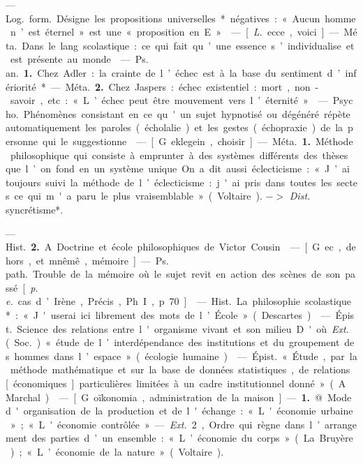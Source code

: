 
	\begin{itemize}[leftmargin=1cm, label=, itemsep=1pt]

 — \si{Log.} \si{form.} Désigne les propositions universelles* négatives : « Aucun homme n’est éternel » est une
« proposition en E ».

 — [{\it L.} ecce, voici] — \si{Méta.} Dans
le lang. scolastique : ce qui fait qu’une
essence s’individualise et est présente au monde.

 — \si{Ps. an.} {\bf 1.} Chez Adler : la
crainte de l’échec est à la base du
sentiment d’infériorité*. — \si{Méta.}
 {\bf 2.} Chez Jaspers : échec existentiel :
mort, non-savoir, etc. : « L’échec
peut être mouvement vers l’éternité. »

 — \si{Psycho.}
Phénomènes consistant en ce qu'un
sujet hypnotisé ou dégénéré répète
automatiquement les paroles (écholalie) et les gestes (échopraxie) de la
personne qui le suggestionne.

 — [G. eklegein, choisir] —
\si{Méta.} {\bf 1.} Méthode philosophique qui
consiste à emprunter à des systèmes
différents des thèses que l’on fond
en un système unique. On a dit aussi
éclecticisme : « J’ai toujours suivi la
méthode de l’éclecticisme : j'ai pris
dans toutes les sectes ce qui m'a
paru le plus vraisemblable » (Voltaire). $->$ {\it Dist.} syncrétisme*.

— \si{Hist.} {\bf 2.} A. Doctrine et école
philosophiques de Victor Cousin.

 — [G. ec, dehors, et mnêmê,
mémoire] — \si{Ps. path.} Trouble de
la mémoire où le sujet revit en action
des scènes de son passé [{\it p. e.} cas
d’Irène, Précis, Ph. I, p. 70].

 — \si{Hist.} La philosophie scolastique* : « J'userai ici librement
des mots de l’École » (Descartes).

 — \si{Épist.} Science des relations entre l'organisme vivant et
son milieu. D'où {\it Ext.} (\si{Soc.}) « étude
de l’interdépendance des institutions
et du groupement des hommes dans
l’espace » (écologie humaine).

 — \si{Épist.} « Étude, par la
méthode mathématique et sur la
base de données statistiques, de
relations [économiques] particulières limitées à un cadre institutionnel donné ». (A. Marchal).

 — [G. oïkonomia, administration de la maison] — {\bf 1.} @ Mode
d'organisation de la production et
de l'échange : « L'économie urbaine»;
« L'économie contrôlée ». — {\it Ext.} 2,
Ordre qui règne dans l’arrangement
des parties d’un ensemble : « L’économie du corps » (La Bruyère);
« L’économie de la nature » (Voltaire).


\end{itemize}
